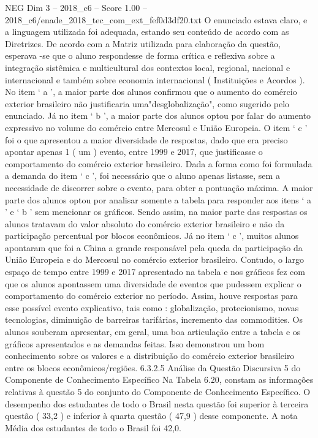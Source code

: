 \begin{textsample}{NEG Dim 3 – 2018\_c6 – Score 1.00 – 2018\_c6/enade\_2018\_tec\_com\_ext\_fef0d3df20.txt}
O enunciado estava claro, e a linguagem utilizada foi adequada, estando seu conteúdo de acordo com as Diretrizes.
De acordo com a Matriz utilizada para elaboração da questão, esperava -se que o aluno respondesse de forma crítica e reflexiva sobre a integração sistêmica e multicultural dos contextos local, regional, nacional e internacional e também sobre economia internacional ( Instituições e Acordos ).
No item ‘ a ’, a maior parte dos alunos confirmou que o aumento do comércio exterior brasileiro não justificaria uma"desglobalização", como sugerido pelo enunciado.
Já no item ‘ b ’, a maior parte dos alunos optou por falar do aumento expressivo no volume do comércio entre Mercosul e União Europeia.
O item ‘ c ’ foi o que apresentou a maior diversidade de respostas, dado que era preciso apontar apenas 1 ( um ) evento, entre 1999 e 2017, que justificasse o comportamento do comércio exterior brasileiro.
Dada a forma como foi formulada a demanda do item ‘ c ’, foi necessário que o aluno apenas listasse, sem a necessidade de discorrer sobre o evento, para obter a pontuação máxima.
A maior parte dos alunos optou por analisar somente a tabela para responder aos itens ‘ a ’ e ‘ b ’ sem mencionar os gráficos.
Sendo assim, na maior parte das respostas os alunos tratavam do valor absoluto do comércio exterior brasileiro e não da participação percentual por blocos econômicos.
Já no item ‘ c ’, muitos alunos apontaram que foi a China a grande responsável pela queda da participação da União Europeia e do Mercosul no comércio exterior brasileiro.
Contudo, o largo espaço de tempo entre 1999 e 2017 apresentado na tabela e nos gráficos fez com que os alunos apontassem uma diversidade de eventos que pudessem explicar o comportamento do comércio exterior no período.
Assim, houve respostas para esse possível evento explicativo, tais como : globalização, protecionismo, novas tecnologias, diminuição de barreiras tarifárias, incremento das commodities.
Os alunos souberam apresentar, em geral, uma boa articulação entre a tabela e os gráficos apresentados e as demandas feitas.
Isso demonstrou um bom conhecimento sobre os valores e a distribuição do comércio exterior brasileiro entre os blocos econômicos/regiões. 6.3.2.5 Análise da Questão Discursiva 5 do Componente de Conhecimento Específico Na Tabela 6.20, constam as informações relativas à questão 5 do conjunto do Componente de Conhecimento Específico.
O desempenho dos estudantes de todo o Brasil nesta questão foi superior à terceira questão ( 33,2 ) e inferior à quarta questão ( 47,9 ) desse componente.
A nota Média dos estudantes de todo o Brasil foi 42,0.

\end{textsample}
